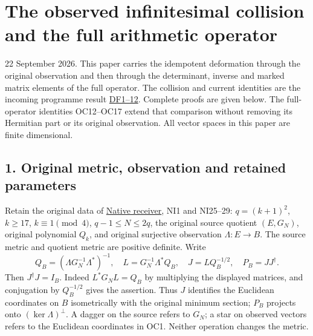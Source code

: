 \documentclass[
]{article}
\author{}
\date{}
\begin{document}
{
\setcounter{tocdepth}{3}
\tableofcontents
}
\section{The observed infinitesimal collision and the full arithmetic
operator}\label{the-observed-infinitesimal-collision-and-the-full-arithmetic-operator}

22 September 2026. This paper carries the idempotent deformation through
the original observation and then through the determinant, inverse and
marked matrix elements of the full operator. The collision and current
identities are the incoming programme result
\href{https://github.com/KokunoYumeto/zeta-function-research-reader/blob/4ba9285b66af58a6d58fc502a494c1fb45ca5b79/workbenches/splitzero-tandem/continuations/20260922-support-transport/OBSERVED_DEFORMATION_AND_CURRENT.md\#L22}{DF1--12}.
Complete proofs are given below. The full-operator identities OC12--OC17
extend that comparison without removing its Hermitian part or its
original observation. All vector spaces in this paper are finite
dimensional.

\subsection{1. Original metric, observation and retained
parameters}\label{original-metric-observation-and-retained-parameters}

Retain the original data of
\href{https://github.com/KokunoYumeto/zeta-function-research-reader/blob/c9df443d9e1df000dfbb083943f97197e746eb08/workbenches/splitzero-tandem/branches/identity-absorber-square/NATIVE_DUAL_NUMBER_RECEIVER.md}{Native
receiver}, NI1 and NI25--29: \(q=(k+1)^2\), \(k\ge17\),
\(k\equiv1\pmod4\), \(q-1\le N\le2q\), the original source quotient
\((E,G_N)\), original polynomial \(Q_k\), and original surjective
observation \(\Lambda:E\to B\). The source metric and quotient metric
are positive definite. Write \[
Q_B=(\Lambda G_N^{-1}\Lambda^*)^{-1},\quad
L=G_N^{-1}\Lambda^*Q_B,\quad J=LQ_B^{-1/2},\quad P_B=JJ^\dagger.
\tag{OC1}
\] Then \(J^\dagger J=I_B\). Indeed \(L^*G_NL=Q_B\) by multiplying the
displayed matrices, and conjugation by \(Q_B^{-1/2}\) gives the
assertion. Thus \(J\) identifies the Euclidean coordinates on \(B\)
isometrically with the original minimum section; \(P_B\) projects onto
\((\ker\Lambda)^\perp\). A dagger on the source refers to \(G_N\); a
star on observed vectors refers to the Euclidean coordinates in OC1.
Neither operation changes the metric.
\end{document}
